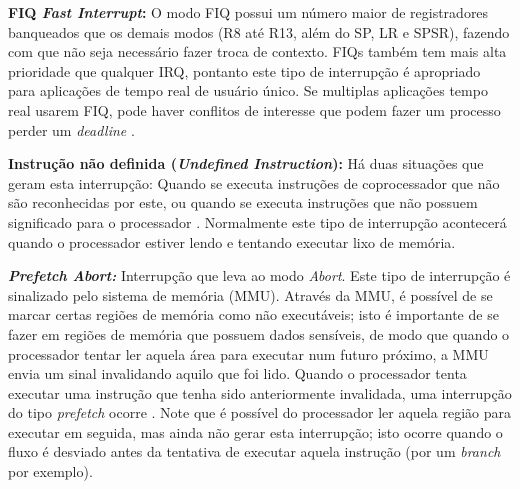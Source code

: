 \textbf{FIQ \emph{Fast Interrupt}:} O modo FIQ possui um número maior de registradores banqueados que os demais modos (R8 até R13, além do SP, LR e SPSR), fazendo com que não seja necessário fazer troca de contexto. FIQs também tem mais alta prioridade que qualquer IRQ, pontanto este tipo de interrupção é apropriado para aplicações de tempo real de usuário único. Se multiplas aplicações tempo real usarem FIQ, pode haver conflitos de interesse que podem fazer um processo perder um \emph{deadline} \cite[p.~66]{armarm}.


\textbf{Instrução não definida (\emph{Undefined Instruction}):} 
Há duas situações que geram esta interrupção: Quando se executa instruções de coprocessador que não são reconhecidas por este, ou quando se executa instruções que não possuem significado para o processador \cite[p.~36]{armarm}. Normalmente este tipo de interrupção acontecerá quando o processador estiver lendo e tentando executar lixo de memória.


\textbf{\emph{Prefetch Abort: }} Interrupção que leva ao modo \emph{Abort}. Este tipo de interrupção é sinalizado pelo sistema de memória (MMU). Através da MMU, é possível de se marcar certas regiões de memória como não executáveis; isto é importante de se fazer em regiões de memória que possuem dados sensíveis, de modo que quando o processador tentar ler aquela área para executar num futuro próximo, a MMU envia um sinal invalidando aquilo que foi lido. Quando o processador tenta executar uma instrução que tenha sido anteriormente invalidada, uma interrupção do tipo \emph{prefetch} ocorre \cite[p.~58]{armarm}. Note que é possível do processador ler aquela região para executar em seguida, mas ainda não gerar esta interrupção; isto ocorre quando o fluxo é desviado antes da tentativa de executar aquela instrução (por um \emph{branch} por exemplo).


